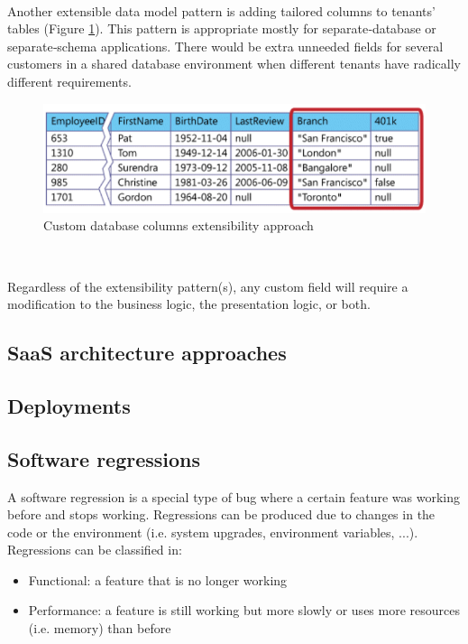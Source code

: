 \documentclass[11pt,english]{article} %
\begin{document}
\

Another extensible data model pattern is adding tailored columns to tenants' tables (Figure \ref{fig:custom-database-columns}).
This pattern is appropriate mostly for separate‐database or separate‐schema applications.
There would be extra  unneeded fields for several customers in a shared database environment when different tenants have radically different requirements.

\begin{figure}[H]
    \centering
    \includegraphics[scale=0.5]{img/custom-database-columns.png}
    \caption{Custom database columns extensibility approach}
    \label{fig:custom-database-columns}
\end{figure}

\   

Regardless of the extensibility pattern(s), any custom field will require a modification to the business logic, the presentation logic, or both.



\subsection{SaaS architecture approaches}

\subsection{Deployments}

\subsection{Software regressions}
A software regression is a special type of bug where a certain feature was working before and stops working.
Regressions can be produced due to changes in the code or the environment (i.e. system upgrades, environment variables, ...).
Regressions can be classified in:
\begin{itemize}
    \item Functional: a feature that is no longer working
    \item Performance: a feature is still working but more slowly or uses more resources (i.e. memory) than before
\end{itemize}
\end{document}
